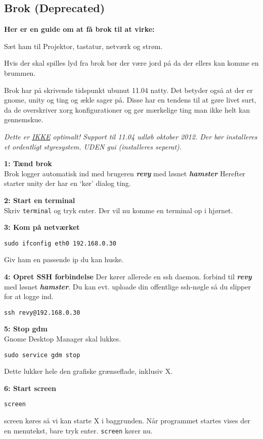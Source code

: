 \documentclass[10pt,a4paper,danish]{article}
\newcommand{\code}[1]{\colorbox{verbgray}{\texttt{#1}}}
\begin{document}
\subsection{Brok (Deprecated)}
\textbf{Her er en guide om at få brok til at virke:}

Sæt ham til
Projektor, tastatur, netværk og strøm.

Hvis der skal spilles lyd fra brok bør der være jord på da der ellers kan komme
en brummen.

Brok har på skrivende tidspunkt ubunut 11.04 natty.
Det betyder også at der er gnome, unity og ting og ækle sager på.
Disse har en tendens til at gøre livet surt, da de overskriver xorg
konfigurationer og gør mærkelige ting man ikke helt kan gennemskue.

\textit{Dette er \uline{IKKE} optimalt!
  Support til 11.04 udløb oktober 2012. Der bør installeres et ordentligt
  styresystem. UDEN gui (installeres seperat).}

\textbf{1: Tænd brok}\\
Brok logger automatisk ind med brugeren \textbf{\textit{revy}} med løsnet \textbf{\textit{hamster}}
Herefter starter unity der har en `kør' dialog ting.

\textbf{2: Start en terminal}\\
Skriv \code{terminal} og tryk enter.
Der vil nu komme en terminal op i hjørnet.

\textbf{3: Kom på netværket}\\
\begin{verbatim}
sudo ifconfig eth0 192.168.0.30
\end{verbatim}
Giv ham en passende ip du kan huske.

\textbf{4: Opret SSH forbindelse}
Der kører allerede en ssh daemon.
forbind til \textbf{\textit{revy}} med løsnet \textbf{\textit{hamster}}.
Du kan evt. uploade din offentlige ssh-nøgle så du slipper for at logge ind.
\begin{verbatim}
ssh revy@192.168.0.30
\end{verbatim}

\textbf{5: Stop gdm}\\
Gnome Desktop Manager skal lukkes.
\begin{verbatim}
sudo service gdm stop
\end{verbatim}
Dette lukker hele den grafiske grænseflade, inklusiv X.

\textbf{6: Start screen}\\
\begin{verbatim}
screen
\end{verbatim}
screen køres så vi kan starte X i baggrunden.
Når programmet startes vises der en menutekst, bare tryk enter.
\texttt{screen} kører nu.
\end{document}
